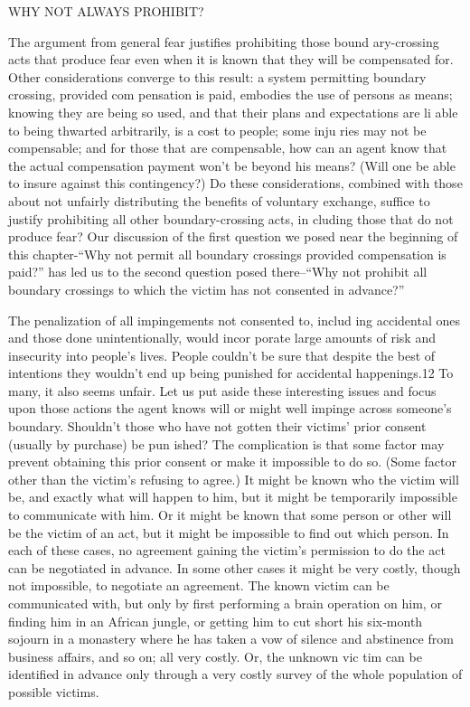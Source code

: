 \documentclass[11pt,openany]{book}
\begin{document}
WHY NOT ALWAYS PROHIBIT? 

The argument from general fear justifies prohibiting those bound ary-crossing acts that produce fear even when it is known that they will be compensated for. Other considerations converge to this result: a system permitting boundary crossing, provided com pensation is paid, embodies the use of persons as means; knowing they are being so used, and that their plans and expectations are li able to being thwarted arbitrarily, is a cost to people; some inju ries may not be compensable; and for those that are compensable, how can an agent know that the actual compensation payment won't be beyond his means? (Will one be able to insure against this contingency?) Do these considerations, combined with those about not unfairly distributing the benefits of voluntary exchange, suffice to justify prohibiting all other boundary-crossing acts, in cluding those that do not produce fear? Our discussion of the first question we posed near the beginning of this chapter-``Why not permit all boundary crossings provided compensation is paid?'' has led us to the second question posed there--``Why not prohibit all boundary crossings to which the victim has not consented in advance?'' 

The penalization of all impingements not consented to, includ ing accidental ones and those done unintentionally, would incor porate large amounts of risk and insecurity into people's lives. People couldn't be sure that despite the best of intentions they wouldn't end up being punished for accidental happenings.12 To many, it also seems unfair. Let us put aside these interesting issues and focus upon those actions the agent knows will or might well impinge across someone's boundary. Shouldn't those who have not gotten their victims' prior consent (usually by purchase) be pun ished? The complication is that some factor may prevent obtaining this prior consent or make it impossible to do so. (Some factor other than the victim's refusing to agree.) It might be known who the victim will be, and exactly what will happen to him, but it might be temporarily impossible to communicate with him. Or it might be known that some person or other will be the victim of an act, but it might be impossible to find out which person. In each of these cases, no agreement gaining the victim's permission to do the act can be negotiated in advance. In some other cases it might be very costly, though not impossible, to negotiate an agreement. The known victim can be communicated with, but only by first performing a brain operation on him, or finding him in an African jungle, or getting him to cut short his six-month sojourn in a monastery where he has taken a vow of silence and abstinence from business affairs, and so on; all very costly. Or, the unknown vic tim can be identified in advance only through a very costly survey of the whole population of possible victims. 
\end{document}
